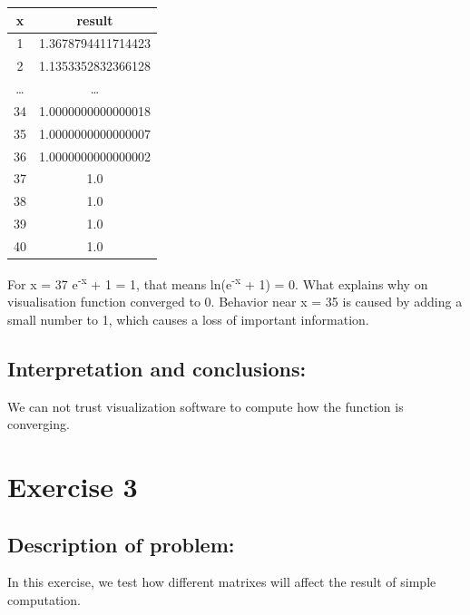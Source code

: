 \documentclass{article}
\begin{document}
\begin{center}
    \begin{tabular}{| c | c |}
        \hline
        x & result \\
        \hline
        \hline
        1 & 1.3678794411714423 \\
        \hline
        2 & 1.1353352832366128 \\
        \dots & \dots \\
        34 & 1.0000000000000018 \\
        \hline
        35 & 1.0000000000000007 \\
        \hline
        36 & 1.0000000000000002 \\
        \hline
        37 & 1.0 \\
        \hline
        38 & 1.0 \\
        \hline
        39 & 1.0 \\
        \hline
        40 & 1.0 \\
        \hline

    \end{tabular}
    \end{center}
For x = 37 e\textsuperscript{-x} + 1 = 1, that means ln(e\textsuperscript{-x} + 1) = 0. What explains why on visualisation function converged to 0. Behavior near x = 35 is caused by adding a small number to 1, which causes a loss of important information. 
\subsection*{Interpretation and conclusions:}
We can not trust visualization software to compute how the function is converging.
\section*{Exercise 3}
\subsection*{Description of problem:}
In this exercise, we test how different matrixes will affect the result of simple computation.
\end{document}
